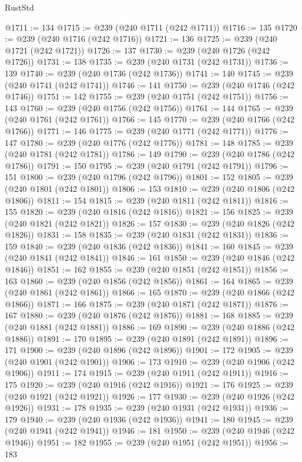 \begin{lexlean}{RustStd}
\begin{coremodule}
@1711 := 134
@1715 := @239 (@240 @1711 (@242 @1711))
@1716 := 135
@1720 := @239 (@240 @1716 (@242 @1716))
@1721 := 136
@1725 := @239 (@240 @1721 (@242 @1721))
@1726 := 137
@1730 := @239 (@240 @1726 (@242 @1726))
@1731 := 138
@1735 := @239 (@240 @1731 (@242 @1731))
@1736 := 139
@1740 := @239 (@240 @1736 (@242 @1736))
@1741 := 140
@1745 := @239 (@240 @1741 (@242 @1741))
@1746 := 141
@1750 := @239 (@240 @1746 (@242 @1746))
@1751 := 142
@1755 := @239 (@240 @1751 (@242 @1751))
@1756 := 143
@1760 := @239 (@240 @1756 (@242 @1756))
@1761 := 144
@1765 := @239 (@240 @1761 (@242 @1761))
@1766 := 145
@1770 := @239 (@240 @1766 (@242 @1766))
@1771 := 146
@1775 := @239 (@240 @1771 (@242 @1771))
@1776 := 147
@1780 := @239 (@240 @1776 (@242 @1776))
@1781 := 148
@1785 := @239 (@240 @1781 (@242 @1781))
@1786 := 149
@1790 := @239 (@240 @1786 (@242 @1786))
@1791 := 150
@1795 := @239 (@240 @1791 (@242 @1791))
@1796 := 151
@1800 := @239 (@240 @1796 (@242 @1796))
@1801 := 152
@1805 := @239 (@240 @1801 (@242 @1801))
@1806 := 153
@1810 := @239 (@240 @1806 (@242 @1806))
@1811 := 154
@1815 := @239 (@240 @1811 (@242 @1811))
@1816 := 155
@1820 := @239 (@240 @1816 (@242 @1816))
@1821 := 156
@1825 := @239 (@240 @1821 (@242 @1821))
@1826 := 157
@1830 := @239 (@240 @1826 (@242 @1826))
@1831 := 158
@1835 := @239 (@240 @1831 (@242 @1831))
@1836 := 159
@1840 := @239 (@240 @1836 (@242 @1836))
@1841 := 160
@1845 := @239 (@240 @1841 (@242 @1841))
@1846 := 161
@1850 := @239 (@240 @1846 (@242 @1846))
@1851 := 162
@1855 := @239 (@240 @1851 (@242 @1851))
@1856 := 163
@1860 := @239 (@240 @1856 (@242 @1856))
@1861 := 164
@1865 := @239 (@240 @1861 (@242 @1861))
@1866 := 165
@1870 := @239 (@240 @1866 (@242 @1866))
@1871 := 166
@1875 := @239 (@240 @1871 (@242 @1871))
@1876 := 167
@1880 := @239 (@240 @1876 (@242 @1876))
@1881 := 168
@1885 := @239 (@240 @1881 (@242 @1881))
@1886 := 169
@1890 := @239 (@240 @1886 (@242 @1886))
@1891 := 170
@1895 := @239 (@240 @1891 (@242 @1891))
@1896 := 171
@1900 := @239 (@240 @1896 (@242 @1896))
@1901 := 172
@1905 := @239 (@240 @1901 (@242 @1901))
@1906 := 173
@1910 := @239 (@240 @1906 (@242 @1906))
@1911 := 174
@1915 := @239 (@240 @1911 (@242 @1911))
@1916 := 175
@1920 := @239 (@240 @1916 (@242 @1916))
@1921 := 176
@1925 := @239 (@240 @1921 (@242 @1921))
@1926 := 177
@1930 := @239 (@240 @1926 (@242 @1926))
@1931 := 178
@1935 := @239 (@240 @1931 (@242 @1931))
@1936 := 179
@1940 := @239 (@240 @1936 (@242 @1936))
@1941 := 180
@1945 := @239 (@240 @1941 (@242 @1941))
@1946 := 181
@1950 := @239 (@240 @1946 (@242 @1946))
@1951 := 182
@1955 := @239 (@240 @1951 (@242 @1951))
@1956 := 183

\end{coremodule}
\end{lexlean}
